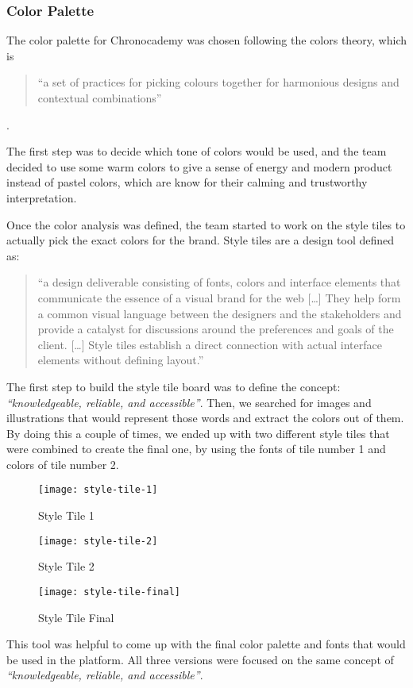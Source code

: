 \subsubsection{Color Palette}\label{subsubsec:color-palette}
The color palette for Chronocademy was chosen following the colors theory, which is

\begin{quote}
    ``a set of practices for picking colours together for harmonious designs and contextual combinations''
\end{quote}\cite[The Color Theory]{colorTheory}.

The first step was to decide which tone of colors would be used, and the team decided to use some warm colors to give a sense of energy and modern product instead of pastel colors, which are know for their calming and trustworthy interpretation.

Once the color analysis was defined, the team started to work on the style tiles to actually pick the exact colors for the brand.
Style tiles are a design tool defined as:

\begin{quote}
    ``a design deliverable consisting of fonts, colors and interface elements that communicate the essence of a visual brand for the web
    [\ldots]
    They help form a common visual language between the designers and the stakeholders and provide a catalyst for discussions around the preferences and goals of the client.
    [\ldots]
    Style tiles establish a direct connection with actual interface elements without defining layout.''
\end{quote}\cite[Style Tiles]{styleTiles}

The first step to build the style tile board was to define the concept: \textit{``knowledgeable, reliable, and accessible''}.
Then, we searched for images and illustrations that would represent those words and extract the colors out of them.
By doing this a couple of times, we ended up with two different style tiles that were combined to create the final one, by using the fonts of tile number 1 and colors of tile number 2.\newline

\begin{figure}[h]
    \centering
    \texttt{[image: style-tile-1]}
    \caption{Style Tile 1}
    \label{fig:figure2}
\end{figure}
\begin{figure}[h]
    \centering
    \texttt{[image: style-tile-2]}
    \caption{Style Tile 2}
    \centering
    \texttt{[image: style-tile-final]}
    \caption{Style Tile Final}
    \label{fig:figure3}
\end{figure}
This tool was helpful to come up with the final color palette and fonts that would be used in the platform.
All three versions were focused on the same concept of \textit{``knowledgeable, reliable, and accessible''}.
\clearpage

